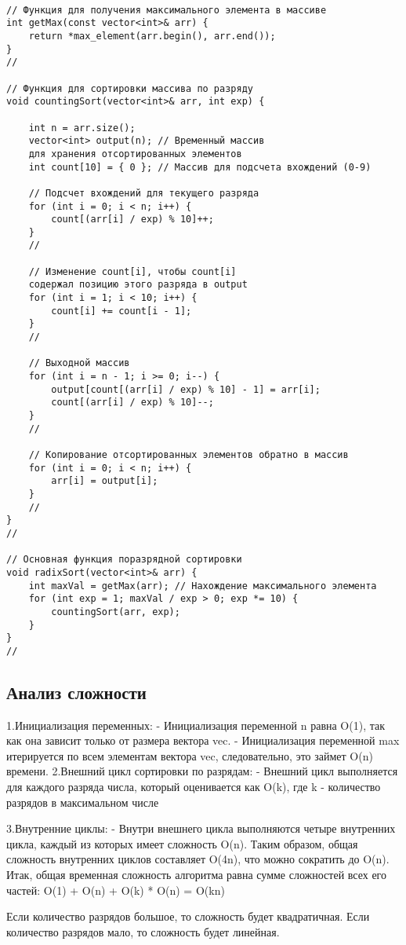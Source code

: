 \documentclass[bachelor, och, referat, times]{SCWorks}
\begin{document}
\begin{verbatim}

// Функция для получения максимального элемента в массиве
int getMax(const vector<int>& arr) {
    return *max_element(arr.begin(), arr.end());
}
//

// Функция для сортировки массива по разряду
void countingSort(vector<int>& arr, int exp) {

    int n = arr.size();
    vector<int> output(n); // Временный массив 
    для хранения отсортированных элементов
    int count[10] = { 0 }; // Массив для подсчета вхождений (0-9)

    // Подсчет вхождений для текущего разряда
    for (int i = 0; i < n; i++) {
        count[(arr[i] / exp) % 10]++;
    }
    //

    // Изменение count[i], чтобы count[i] 
    содержал позицию этого разряда в output
    for (int i = 1; i < 10; i++) {
        count[i] += count[i - 1];
    }
    //

    // Выходной массив
    for (int i = n - 1; i >= 0; i--) {
        output[count[(arr[i] / exp) % 10] - 1] = arr[i];
        count[(arr[i] / exp) % 10]--;
    }
    //

    // Копирование отсортированных элементов обратно в массив
    for (int i = 0; i < n; i++) {
        arr[i] = output[i];
    }
    //
}
//

// Основная функция поразрядной сортировки
void radixSort(vector<int>& arr) {
    int maxVal = getMax(arr); // Нахождение максимального элемента
    for (int exp = 1; maxVal / exp > 0; exp *= 10) {
        countingSort(arr, exp);
    }
}
//

 \end{verbatim}

 \subsection{Анализ сложности}

 1.Инициализация переменных:
 - Инициализация переменной n равна O(1), так как она зависит только от размера вектора vec.
 -  Инициализация переменной max итерируется по всем элементам вектора vec, следовательно, это займет O(n) времени.
2.Внешний цикл сортировки по разрядам:
 - Внешний цикл выполняется для каждого разряда числа, который оценивается как O(k), где k - количество разрядов в максимальном числе

3.Внутренние циклы:
 - Внутри внешнего цикла выполняются четыре внутренних цикла, каждый из которых имеет сложность O(n). Таким образом, общая сложность внутренних циклов составляет O(4n), что можно сократить до O(n).
Итак, общая временная сложность алгоритма равна сумме сложностей всех его частей:
O(1) + O(n) + O(k) * O(n) = O(kn)


Если количество разрядов большое, то сложность будет квадратичная. 
Если количество разрядов мало, то сложность будет линейная.




    \appendix
     
\end{document}
